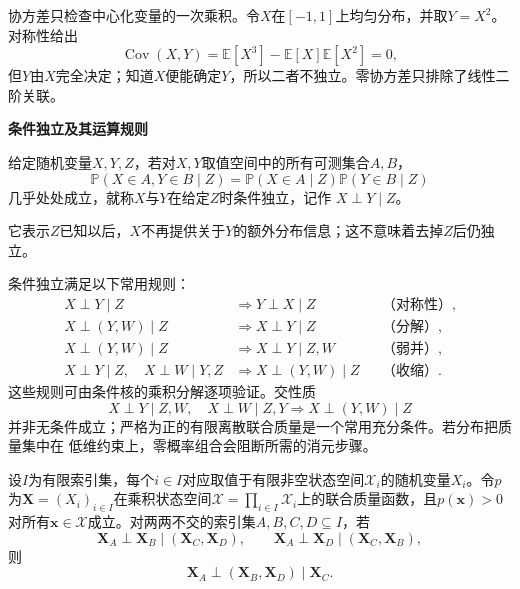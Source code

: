 协方差只检查中心化变量的一次乘积。令\(X\)在\([-1,1]\)上均匀分布，并取\(Y=X^2\)。对称性给出
\[ \operatorname{Cov}(X,Y)
  =\mathbb{E}[X^3]-\mathbb{E}[X]\mathbb{E}[X^2]=0, \]
但\(Y\)由\(X\)完全决定；知道\(X\)便能确定\(Y\)，所以二者不独立。零协方差只排除了线性二阶关联。

\par\medskip\noindent\textbf{条件独立及其运算规则}\quad
\begin{definition}[条件独立]
  \label{def:probability-conditional-independence}
  给定随机变量\(X,Y,Z\)，若对\(X,Y\)取值空间中的所有可测集合\(A,B\)，
\[ \mathbb{P}(X\in A,Y\in B\mid Z)
  =\mathbb{P}(X\in A\mid Z)\mathbb{P}(Y\in B\mid Z) \]
几乎处处成立，就称\(X\)与\(Y\)在给定\(Z\)时条件独立，记作
\(X\perp Y\mid Z\)。
\end{definition}
它表示\(Z\)已知以后，\(X\)不再提供关于\(Y\)的额外分布信息；这不意味着去掉\(Z\)后仍独立。

条件独立满足以下常用规则：
\[
\begin{aligned}
  X\perp Y\mid Z
  &\Longrightarrow Y\perp X\mid Z
  &&\text{（对称性）},\\
  X\perp(Y,W)\mid Z
  &\Longrightarrow X\perp Y\mid Z
  &&\text{（分解）},\\
  X\perp(Y,W)\mid Z
  &\Longrightarrow X\perp Y\mid Z,W
  &&\text{（弱并）},\\
  X\perp Y\mid Z,\quad X\perp W\mid Y,Z
  &\Longrightarrow X\perp(Y,W)\mid Z
  &&\text{（收缩）}.
\end{aligned}
\]
这些规则可由条件核的乘积分解逐项验证。交性质
\[ X\perp Y\mid Z,W,\quad
  X\perp W\mid Z,Y\Longrightarrow X\perp(Y,W)\mid Z \]
并非无条件成立；严格为正的有限离散联合质量是一个常用充分条件。若分布把质量集中在
低维约束上，零概率组合会阻断所需的消元步骤。

\begin{lemma}[严格正离散分布的交性质]
  \label{lem:probability-positive-intersection}
  设$I$为有限索引集，每个$i\in I$对应取值于有限非空状态空间$\mathcal{X}_i$的随机变量$X_i$。令$p$为$\bm{X}=(X_i)_{i\in I}$在乘积状态空间$\mathcal{X}=\prod_{i\in I}\mathcal{X}_i$上的联合质量函数，且$p(\bm{x})>0$对所有$\bm{x}\in\mathcal{X}$成立。对两两不交的索引集$A,B,C,D\subseteq I$，若
  \[
    \bm{X}_A\perp\bm{X}_B\mid(\bm{X}_C,\bm{X}_D),
    \qquad
    \bm{X}_A\perp\bm{X}_D\mid(\bm{X}_C,\bm{X}_B),
  \]
  则
  \[
    \bm{X}_A\perp(\bm{X}_B,\bm{X}_D)\mid\bm{X}_C.
  \]
\end{lemma}

